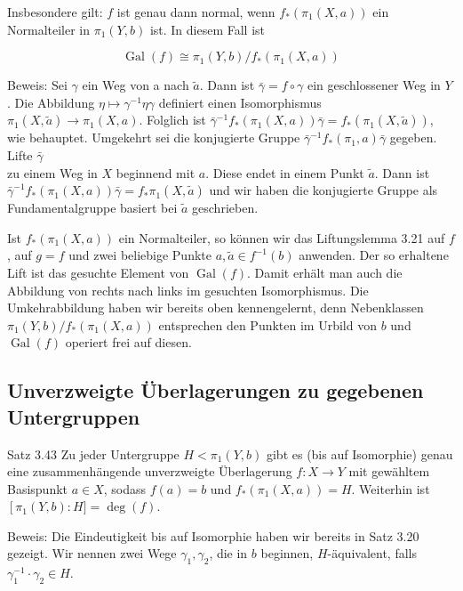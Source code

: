\documentclass[10pt, letterpaper]{article}
\begin{document}
Insbesondere gilt: $f$ ist genau dann normal, wenn $f_{*}\left(\pi_{1}(X, a)\right)$ ein Normalteiler in $\pi_{1}(Y, b)$ ist. In diesem Fall ist

$$
\operatorname{Gal}(f) \cong \pi_{1}(Y, b) / f_{*}\left(\pi_{1}(X, a)\right)
$$

Beweis: Sei $\gamma$ ein Weg von a nach $\widetilde{a}$. Dann ist $\bar{\gamma}=f \circ \gamma$ ein geschlossener Weg in $Y$. Die Abbildung $\eta \mapsto \gamma^{-1} \eta \gamma$ definiert einen Isomorphismus $\pi_{1}(X, \widetilde{a}) \rightarrow \pi_{1}(X, a)$. Folglich ist $\bar{\gamma}^{-1} f_{*}\left(\pi_{1}(X, a)\right) \bar{\gamma}=f_{*}\left(\pi_{1}(X, \widetilde{a})\right)$, wie behauptet. Umgekehrt sei die konjugierte Gruppe $\bar{\gamma}^{-1} f_{*}\left(\pi_{1}, a\right) \bar{\gamma}$ gegeben. Lifte $\bar{\gamma}$\\
zu einem Weg in $X$ beginnend mit $a$. Diese endet in einem Punkt $\widetilde{a}$. Dann ist $\bar{\gamma}^{-1} f_{*}\left(\pi_{1}(X, a)\right) \bar{\gamma}=f_{*} \pi_{1}(X, \widetilde{a})$ und wir haben die konjugierte Gruppe als Fundamentalgruppe basiert bei $\widetilde{a}$ geschrieben.

Ist $f_{*}\left(\pi_{1}(X, a)\right)$ ein Normalteiler, so können wir das Liftungslemma 3.21 auf $f$, auf $g=f$ und zwei beliebige Punkte $a, \widetilde{a} \in f^{-1}(b)$ anwenden. Der so erhaltene Lift ist das gesuchte Element von $\operatorname{Gal}(f)$. Damit erhält man auch die Abbildung von rechts nach links im gesuchten Isomorphismus. Die Umkehrabbildung haben wir bereits oben kennengelernt, denn Nebenklassen $\pi_{1}(Y, b) / f_{*}\left(\pi_{1}(X, a)\right)$ entsprechen den Punkten im Urbild von $b$ und $\operatorname{Gal}(f)$ operiert frei auf diesen.



\pagebreak

\subsection {Unverzweigte Überlagerungen zu gegebenen Untergruppen}
Satz 3.43 Zu jeder Untergruppe $H<\pi_{1}(Y, b)$ gibt es (bis auf Isomorphie) genau eine zusammenhängende unverzweigte Überlagerung $f: X \rightarrow Y$ mit gewähltem Basispunkt $a \in X$, sodass $f(a)=b$ und $f_{*}\left(\pi_{1}(X, a)\right)=H$. Weiterhin ist $\left[\pi_{1}(Y, b):\right. H]=\operatorname{deg}(f)$.

Beweis: Die Eindeutigkeit bis auf Isomorphie haben wir bereits in Satz 3.20 gezeigt. Wir nennen zwei Wege $\gamma_{1}, \gamma_{2}$, die in $b$ beginnen, $H$-äquivalent, falls $\gamma_{1}^{-1} \cdot \gamma_{2} \in H$.
\end{document}
